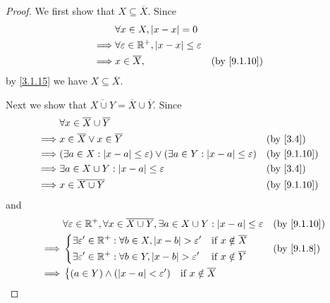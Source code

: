 \begin{proof}
	We first show that \(X \subseteq \overline{X}\).
	Since
	\begin{align*}
		         & \forall x \in X, \abs{x - x} = 0                                            \\
		\implies & \forall \varepsilon \in \R^+, \abs{x - x} \leq \varepsilon                  \\
		\implies & x \in \overline{X},                                        &  & \by{9.1.10}
	\end{align*}
	by \cref{3.1.15} we have \(X \subseteq \overline{X}\).

	Next we show that \(\overline{X \cup Y} = \overline{X} \cup \overline{Y}\).
	Since
	\begin{align*}
		         & \forall x \in \overline{X} \cup \overline{Y}                                                                            \\
		\implies & x \in \overline{X} \lor x \in \overline{Y}                                                             &  & \by{3.4}    \\
		\implies & (\exists a \in X : \abs{x - a} \leq \varepsilon) \lor (\exists a \in Y : \abs{x - a} \leq \varepsilon) &  & \by{9.1.10} \\
		\implies & \exists a \in X \cup Y : \abs{x - a} \leq \varepsilon                                                  &  & \by{3.4}    \\
		\implies & x \in \overline{X \cup Y}                                                                              &  & \by{9.1.10}
	\end{align*}
	and
	\begin{align*}
		         & \forall \varepsilon \in \R^+, \forall x \in \overline{X \cup Y}, \exists a \in X \cup Y : \abs{x - a} \leq \varepsilon &  & \by{9.1.10} \\
		\implies & \begin{dcases}
			           \exists \varepsilon' \in \R^+ : \forall b \in X, \abs{x - b} > \varepsilon' & \text{if } x \notin \overline{X} \\
			           \exists \varepsilon' \in \R^+ : \forall b \in Y, \abs{x - b} > \varepsilon' & \text{if } x \notin \overline{Y}
		           \end{dcases}      &  & \by{9.1.8}                          \\
		\implies & \begin{dcases}
			           (a \in Y) \land (\abs{x - a} < \varepsilon') & \text{if } x \notin \overline{X} \\

\end{dcases}
\end{align*}
\end{proof}

